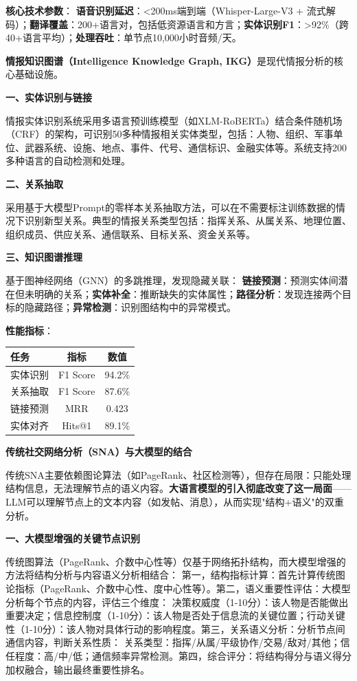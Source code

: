 \textbf{核心技术参数}：
\textbf{语音识别延迟}：<200ms端到端（Whisper-Large-V3 + 流式解码）；\textbf{翻译覆盖}：200+语言对，包括低资源语言和方言；\textbf{实体识别F1}：>92\%（跨40+语言平均）；\textbf{处理吞吐}：单节点10,000小时音频/天。

\textbf{情报知识图谱（Intelligence Knowledge Graph, IKG）}是现代情报分析的核心基础设施。

\textbf{一、实体识别与链接}

情报实体识别系统采用多语言预训练模型（如XLM-RoBERTa）结合条件随机场（CRF）的架构，可识别50多种情报相关实体类型，包括：人物、组织、军事单位、武器系统、设施、地点、事件、代号、通信标识、金融实体等。系统支持200多种语言的自动检测和处理。

\textbf{二、关系抽取}

采用基于大模型Prompt的零样本关系抽取方法，可以在不需要标注训练数据的情况下识别新型关系。典型的情报关系类型包括：指挥关系、从属关系、地理位置、组织成员、供应关系、通信联系、目标关系、资金关系等。

\textbf{三、知识图谱推理}

基于图神经网络（GNN）的多跳推理，发现隐藏关联：
\textbf{链接预测}：预测实体间潜在但未明确的关系；\textbf{实体补全}：推断缺失的实体属性；\textbf{路径分析}：发现连接两个目标的隐藏路径；\textbf{异常检测}：识别图结构中的异常模式。

\textbf{性能指标}：
\begin{center}
\begin{tabular}{lcc}
\toprule
\textbf{任务} & \textbf{指标} & \textbf{数值} \\
\midrule
实体识别 & F1 Score & 94.2\% \\
关系抽取 & F1 Score & 87.6\% \\
链接预测 & MRR & 0.423 \\
实体对齐 & Hits@1 & 89.1\% \\
\bottomrule
\end{tabular}
\end{center}

\textbf{传统社交网络分析（SNA）与大模型的结合}

传统SNA主要依赖图论算法（如PageRank、社区检测等），但存在局限：只能处理结构信息，无法理解节点的语义内容。\textbf{大语言模型的引入彻底改变了这一局面}——LLM可以理解节点上的文本内容（如发帖、消息），从而实现"结构+语义"的双重分析。

\textbf{一、大模型增强的关键节点识别}

传统图算法（PageRank、介数中心性等）仅基于网络拓扑结构，而大模型增强的方法将结构分析与内容语义分析相结合：
第一，结构指标计算：首先计算传统图论指标（PageRank、介数中心性、度中心性等）。第二，语义重要性评估：大模型分析每个节点的内容，评估三个维度： 决策权威度（1-10分）：该人物是否能做出重要决定；信息控制度（1-10分）：该人物是否处于信息流的关键位置；行动关键性（1-10分）：该人物对具体行动的影响程度。第三，关系语义分析：分析节点间通信内容，判断关系性质： 关系类型：指挥/从属/平级协作/交易/敌对/其他；信任程度：高/中/低；通信频率异常检测。第四，综合评分：将结构得分与语义得分加权融合，输出最终重要性排名。

